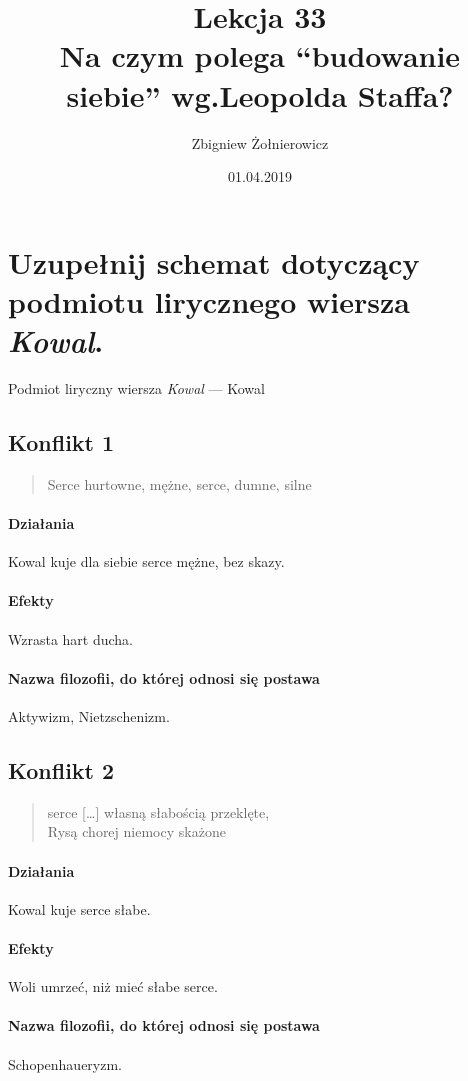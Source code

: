 \documentclass[a4paper]{article}
\begin{document}
\title{
        {\huge Lekcja 33} \\
        {\large Na czym polega ``budowanie siebie'' wg.\@ Leopolda Staffa?}
}
\author{Zbigniew Żołnierowicz}
\date{01.04.2019}
\maketitle
\section{Uzupełnij schemat dotyczący podmiotu lirycznego wiersza \emph{Kowal}.}
\large{Podmiot liryczny wiersza \emph{Kowal} --- Kowal}
\normalsize
\subsection{Konflikt 1}
\begin{quote}
        Serce hurtowne, mężne, serce, dumne, silne
\end{quote}
\paragraph*{Działania}
Kowal kuje dla siebie serce mężne, bez skazy.
\paragraph*{Efekty}
Wzrasta hart ducha.
\paragraph*{Nazwa filozofii, do której odnosi się postawa} Aktywizm, Nietzschenizm.
\subsection{Konflikt 2}
\begin{quote}
        serce [\dots] własną słabością przeklęte, \\
        Rysą chorej niemocy skażone
\end{quote}
\paragraph*{Działania}
Kowal kuje serce słabe.
\paragraph*{Efekty}
Woli umrzeć, niż mieć słabe serce.
\paragraph*{Nazwa filozofii, do której odnosi się postawa}
Schopenhaueryzm.
\end{document}

